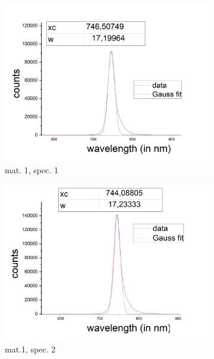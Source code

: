 \begin{figure}[H]
    \centering
    \begin{subfigure}{0.47\textwidth}
        \centering
        \includegraphics[width=\textwidth]{img/output_t1/spekt_m1-3}
        \caption{mat. 1, spec. 1}
	      \label{fig_mono_spec1_1dspec}
    \end{subfigure}
    \begin{subfigure}{0.47\textwidth}
        \centering
        \includegraphics[width=\textwidth]{img/output_t1/spekt_m1-2-1}
        \caption{mat.1, spec. 2}
	      \label{fig_mono_spec2_1dspec}
    \end{subfigure}
    \begin{subfigure}{0.6\textwidth}

\end{subfigure}
\end{figure}
